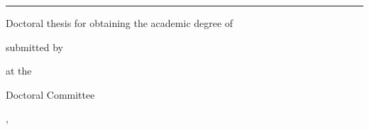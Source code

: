 \makeatletter
\begin{titlepage}
    \centering
    
    {\huge \sffamily\textbf \@title \par}
    \vspace{0.7pt}
    {\rule{2cm}{0.7pt}}
    
    \vspace{0.7pt}
    {\LARGE \sffamily\textbf \@subtitle \par}
    
    \vfill
	{\Large Doctoral thesis for obtaining the academic degree of\par}
	{\huge\sffamily \@degree \par}
    
    \vfill
    {\Large submitted by \par}
    {\huge \@author \par}
    
    \vfill
    {\Large at the \par}
    \begin{figure}[!h]
    	\centering
    \end{figure}
    
    \vfill
    {\Large\sffamily \@department \par}    
    \def\temp{\@group}\ifx\temp\empty
    \else
    	{\Large\sffamily \@group \par}
    \fi
    
    \vfill
    \ifx\committeemembers\empty
    \else
    	{\Large\sffamily Doctoral Committee\par\smallskip}
    	{\large\committeetable{\committeemembers}}
    \fi
    
    \vfill
    {\large\sffamily \@city, \@submissionyear}
\restoregeometry %
\end{titlepage}
\makeatother
\newpage
\mbox{}
\thispagestyle{empty}
\newpage